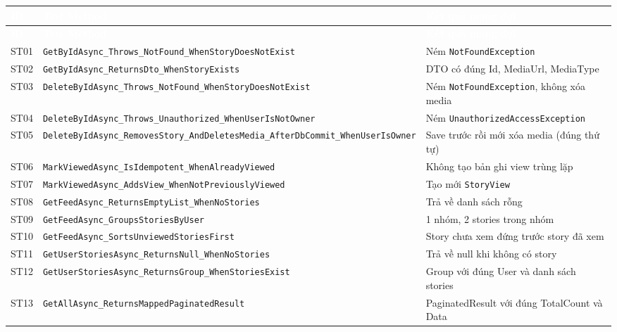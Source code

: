 \documentclass[a4paper]{article}
\begin{document}
\begin{longtable}{|C{0.8cm}|L{5.4cm}|L{7.4cm}|}
\hline
{}
\textcolor{white}{\textbf{ID}} &
\textcolor{white}{\textbf{Test Method}} &
\textcolor{white}{\textbf{Kết quả mong đợi}} \\
\hline
\endfirsthead
\hline
{}
\textcolor{white}{\textbf{ID}} &
\textcolor{white}{\textbf{Test Method}} &
\textcolor{white}{\textbf{Kết quả mong đợi}} \\
\hline
\endhead
\hline
\endfoot

ST01 & \texttt{GetByIdAsync\_Throws\_NotFound\_WhenStoryDoesNotExist} & Ném \texttt{NotFoundException} \\
\hline
ST02 & \texttt{GetByIdAsync\_ReturnsDto\_WhenStoryExists} & DTO có đúng Id, MediaUrl, MediaType \\
\hline
{}
ST03 & \texttt{DeleteByIdAsync\_Throws\_NotFound\_WhenStoryDoesNotExist} & Ném \texttt{NotFoundException}, không xóa media \\
\hline
ST04 & \texttt{DeleteByIdAsync\_Throws\_Unauthorized\_WhenUserIsNotOwner} & Ném \texttt{UnauthorizedAccessException} \\
\hline
{}
ST05 & \texttt{DeleteByIdAsync\_RemovesStory\_AndDeletesMedia\_AfterDbCommit\_WhenUserIsOwner} & Save trước rồi mới xóa media (đúng thứ tự) \\
\hline
ST06 & \texttt{MarkViewedAsync\_IsIdempotent\_WhenAlreadyViewed} & Không tạo bản ghi view trùng lặp \\
\hline
{}
ST07 & \texttt{MarkViewedAsync\_AddsView\_WhenNotPreviouslyViewed} & Tạo mới \texttt{StoryView} \\
\hline
ST08 & \texttt{GetFeedAsync\_ReturnsEmptyList\_WhenNoStories} & Trả về danh sách rỗng \\
\hline
{}
ST09 & \texttt{GetFeedAsync\_GroupsStoriesByUser} & 1 nhóm, 2 stories trong nhóm \\
\hline
ST10 & \texttt{GetFeedAsync\_SortsUnviewedStoriesFirst} & Story chưa xem đứng trước story đã xem \\
\hline
{}
ST11 & \texttt{GetUserStoriesAsync\_ReturnsNull\_WhenNoStories} & Trả về null khi không có story \\
\hline
ST12 & \texttt{GetUserStoriesAsync\_ReturnsGroup\_WhenStoriesExist} & Group với đúng User và danh sách stories \\
\hline
{}
ST13 & \texttt{GetAllAsync\_ReturnsMappedPaginatedResult} & PaginatedResult với đúng TotalCount và Data \\

\end{longtable}
\end{document}
